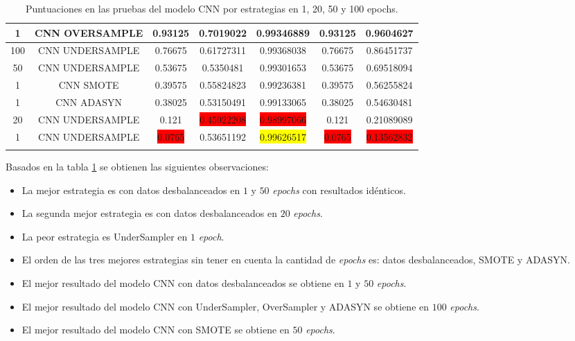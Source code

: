 \begin{longtable}{|c|c|c|c|c|c|c|}
  	1 & CNN OVERSAMPLE & 0.93125 & 0.7019022 & 0.99346889 & 0.93125 & 0.9604627\\ \hline
  	100 & CNN UNDERSAMPLE & 0.76675 & 0.61727311 & 0.99368038 & 0.76675 & 0.86451737\\ \hline
  	50 & CNN UNDERSAMPLE & 0.53675 & 0.5350481 & 0.99301653 & 0.53675 & 0.69518094\\ \hline
  	1 & CNN SMOTE & 0.39575 & 0.55824823 & 0.99236381 & 0.39575 & 0.56255824\\ \hline
  	1 & CNN ADASYN & 0.38025 & 0.53150491 & 0.99133065 & 0.38025 & 0.54630481\\ \hline
  	20 & CNN UNDERSAMPLE & 0.121 & \colorbox{red}{0.45922208} & \colorbox{red}{0.98997066} & 0.121 & 0.21089089\\ \hline
  	1 & CNN UNDERSAMPLE & \colorbox{red}{0.0765} & 0.53651192 & \colorbox{yellow}{0.99626517} & \colorbox{red}{0.0765} & \colorbox{red}{0.13562832}\\ \hline
  	\caption{Puntuaciones en las pruebas del modelo CNN por estrategias en 1, 20, 50 y 100 epochs.}
  	\label{t:9}
  \end{longtable}

Basados en la tabla \ref{t:9} se obtienen las siguientes observaciones:
\begin{itemize}
	\item La mejor estrategia es con datos desbalanceados en $1$ y $50$ \textit{epochs} con resultados id\'{e}nticos.
	\item La segunda mejor estrategia es con datos desbalanceados en $20$ \textit{epochs}.
	\item La peor estrategia es UnderSampler en $1$ \textit{epoch}.
	\item El orden de las tres mejores estrategias sin tener en cuenta la cantidad de \textit{epochs} es: datos desbalanceados, SMOTE y ADASYN.
	\item El mejor resultado del modelo CNN con datos desbalanceados se obtiene en $1$ y $50$ \textit{epochs}.
	\item El mejor resultado del modelo CNN con UnderSampler, OverSampler y ADASYN se obtiene en $100$ \textit{epochs}.
	\item El mejor resultado del modelo CNN con SMOTE se obtiene en $50$ \textit{epochs}.
\end{itemize}

